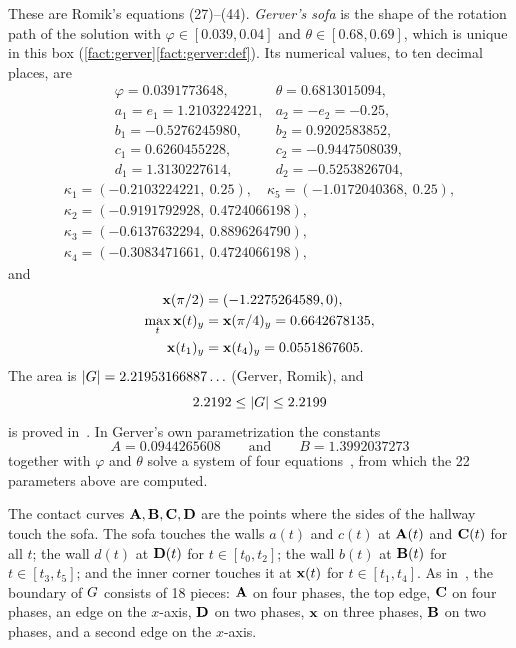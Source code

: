 These are Romik's equations (27)--(44). \emph{Gerver's sofa} is the shape of the
rotation path of the solution with $\varphi\in[0.039,0.04]$ and
$\theta\in[0.68,0.69]$, which is unique in this box
(\cref{fact:gerver}\ref{fact:gerver:def}). Its numerical values, to ten decimal
places, are
\[
\begin{array}{ll}
  \varphi=0.0391773648, & \theta=0.6813015094,\\
  a_1=e_1=1.2103224221, & a_2=-e_2=-0.25,\\
  b_1=-0.5276245980, & b_2=0.9202583852,\\
  c_1=0.6260455228, & c_2=-0.9447508039,\\
  d_1=1.3130227614, & d_2=-0.5253826704,
\end{array}
\]
\[
\begin{array}{l}
  \kappa_1=(-0.2103224221,\ 0.25),\quad \kappa_5=(-1.0172040368,\ 0.25),\\
  \kappa_2=(-0.9191792928,\ 0.4724066198),\\
  \kappa_3=(-0.6137632294,\ 0.8896264790),\\
  \kappa_4=(-0.3083471661,\ 0.4724066198),
\end{array}
\]
and
\begin{align*}
  \mathbf{x}(\pi/2)&=(-1.2275264589,0),\\
  \max_t\mathbf{x}(t)_y&=\mathbf{x}(\pi/4)_y=0.6642678135,\\
  \mathbf{x}(t_1)_y&=\mathbf{x}(t_4)_y=0.0551867605.
\end{align*}
The area is $\lvert G\rvert=2.21953166887\ldots$ (Gerver, Romik), and
\[
  2.2192\le\lvert G\rvert\le2.2199
\]
is proved in~\cite{Companion}.
In Gerver's own parametrization the constants
\[
  A=0.0944265608\qquad\text{and}\qquad B=1.3992037273
\]
together with $\varphi$ and $\theta$ solve a system of four
equations~\cite{Gerver92}, from which the 22 parameters above are computed.

The contact curves $\mathbf{A},\mathbf{B},\mathbf{C},\mathbf{D}$ are the points where the sides of the
hallway touch the sofa. The sofa touches the walls $a(t)$ and $c(t)$ at $\mathbf{A}(t)$
and $\mathbf{C}(t)$ for all $t$; the wall $d(t)$ at $\mathbf{D}(t)$ for $t\in[t_0,t_2]$; the
wall $b(t)$ at $\mathbf{B}(t)$ for $t\in[t_3,t_5]$; and the inner corner touches it at
$\mathbf{x}(t)$ for $t\in[t_1,t_4]$. As in~\cite{Gerver92,Romik18}, the boundary of
$G$ consists of 18 pieces: $\mathbf{A}$ on four phases, the top edge, $\mathbf{C}$ on four
phases, an edge on the $x$-axis, $\mathbf{D}$ on two phases, $\mathbf{x}$ on three phases,
$\mathbf{B}$ on two phases, and a second edge on the $x$-axis.
